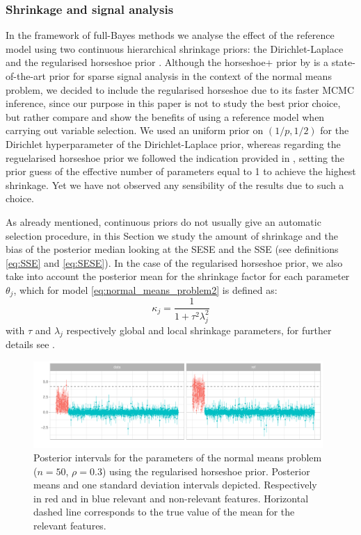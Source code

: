 \documentclass[american,]{article}
\theoremstyle{definition}
\begin{document}
\hypertarget{shrinkage-signal}{%
\subsubsection{Shrinkage and signal analysis}\label{shrinkage-signal}}
In the framework of full-Bayes methods we analyse the effect of the reference model using two continuous hierarchical shrinkage priors: the Dirichlet-Laplace \citep{paper:dirichlet_laplace} and the regularised horseshoe prior \citep{paper:rhs}. Although the horseshoe+ prior by \cite{paper:horseshoe+} is a state-of-the-art prior for sparse signal analysis in the context of the normal means problem, we decided to include the regularised horseshoe due to its faster MCMC inference, since our purpose in this paper is not to study the best prior choice, but rather compare and show the benefits of using a reference model when carrying out variable selection. We used an uniform prior on $(1/p,1/2)$ for the Dirichlet hyperparameter of the Dirichlet-Laplace prior, whereas regarding the reguelarised horseshoe prior we followed the indication provided in \cite{paper:rhs}, setting the prior guess of the effective number of parameters equal to 1 to achieve the highest shrinkage. Yet we have not observed any sensibility of the results due to such a choice.

As already mentioned, continuous priors do not usually give an automatic selection procedure, in this Section we study the amount of shrinkage and the bias of the posterior median looking at the SESE and the SSE (see definitions \eqref{eq:SSE} and \eqref{eq:SESE}). In the case of the regularised horseshoe prior, we also take into account the posterior mean for the shrinkage factor for each parameter $\theta_{j}$, which for model \eqref{eq:normal_means_problem2} is defined as:
\
\begin{equation}
\kappa_{j}=\frac{1}{1+\tau^{2}\lambda_{j}^{2}}
\end{equation}
with $\tau$ and $\lambda_{j}$ respectively global and local shrinkage parameters, for further details see \cite{paper:rhs}.

\begin{figure}[tp]
  \centering
  \includegraphics[width=0.98\textwidth]{graphics/post_int.pdf}
  \caption{Posterior intervals for the parameters of the normal means problem ($n=50$, $\rho=0.3$) using the regularised horseshoe prior. Posterior means and one standard deviation intervals depicted. Respectively in red and in blue relevant and non-relevant features. Horizontal dashed line corresponds to the true value of the mean for the relevant features.\\}
  \label{fig:posterior_intervals}
\end{figure}
\end{document}
